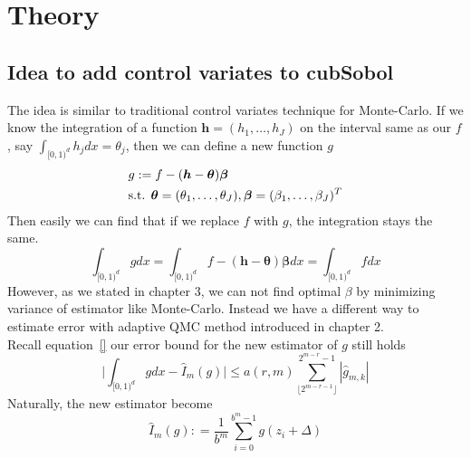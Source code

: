 \section{Theory}
\subsection{Idea to add control variates to cubSobol}
The idea is similar to traditional control variates technique for Monte-Carlo.
If we know the integration of a function $\boldsymbol{h}=(h_1,\dots,h_J)$ on the interval same as our $f$,
say $\int_{[0,1)^d}h_jdx=\theta_j$, then we can define a new function $g$
\begin{align}\label{eq:defg}
    & g:=f-(\boldsymbol{h}-\boldsymbol{\theta})\boldsymbol{\beta}\\
    \notag
    &\text{s.t. }\boldsymbol{\theta}=(\theta_1,\dots,\theta_J),
    \boldsymbol{\beta}=(\beta_1,\dots,\beta_J)^T
\end{align}
Then easily we can find that if we replace $f$ with $g$, the integration stays the same.
\[
	\int_{[0,1)^d}gdx
        =\int_{[0,1)^d}f-(\boldsymbol{h}-\boldsymbol{\theta})\boldsymbol{\beta}dx
			=\int_{[0,1)^d}fdx
\]
However, as we stated in chapter 3, we can not find optimal $\beta$ by minimizing variance of estimator like Monte-Carlo. Instead we have a different way to estimate error with adaptive QMC method introduced in chapter 2.\\
Recall equation~\eqref{} our error bound for the new estimator of $g$ still holds
\begin{equation}\label{eq:qmccvErr}
	\Big|\int_{[0,1)^d}gdx - \hat{I}_m(g)\Big| \leq a(r,m) \sum_{\lfloor 2^{m-r-1} \rfloor}^{2^{m-r}-1} |\hat{g}_{m,k}|
\end{equation}
Naturally, the new estimator become
\begin{equation}\label{eq:estcv}
    \hat{I}_m({g}): = \frac{1}{b^m}\sum_{i=0}^{b^m-1}g(z_i+\Delta)
\end{equation}

